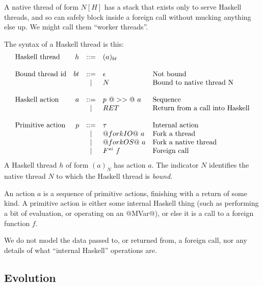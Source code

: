 \documentclass{article}
\newcommand{\fcall}[2]{F^{#1}~#2}
\newcommand{\ret}[1]{RET~#1}
\begin{document}
A native thread of form $N[H]$ has a stack that exists only to serve Haskell 
threads, and so can safely block inside a foreign call without mucking anything
else up.  We might call them ``worker threads''.

The syntax of a Haskell thread is this:
$$
\begin{array}{lrcll}
\mbox{Haskell thread} &  h & ::= & (a)_{bt} \\
\\
\mbox{Bound thread id} & bt & ::= & \epsilon & \mbox{Not bound} \\
        & & | & N & \mbox{Bound to native thread N} \\
\\
\mbox{Haskell action} &  a & ::= & p ~@>>@~ a  & \mbox{Sequence} \\
        & & | & \ret  & \mbox{Return from a call into Haskell} \\
\\
\mbox{Primitive action} &  p & ::= & \tau & \mbox{Internal action} \\
        & & | & @forkIO@~a & \mbox{Fork a thread} \\
        & & | & @forkOS@~a & \mbox{Fork a native thread} \\
        & & | & \fcall{si}{f} & \mbox{Foreign call} 
\end{array}
$$
A Haskell thread $h$ of form $(a)_{N}$ has action $a$.  The indicator
$N$ identifies the native thread $N$ to which the Haskell thread is \emph{bound}.

An action $a$ is a sequence of primitive actions, finishing with a 
return of some kind.  A primitive action is either some internal Haskell
thing (such as performing a bit of evaluation, or operating on an @MVar@),
or else it is a call to a foreign function $f$.

We do not model the data passed to, or returned from, a foreign call, nor
any details of what ``internal Haskell'' operations are.  

\subsection{Evolution}
\end{document}
